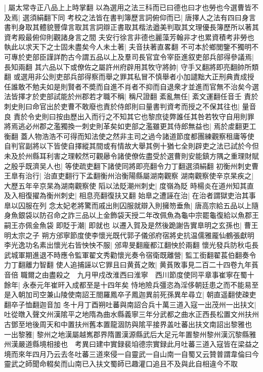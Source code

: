 |{
	屬太常寺正八品上上時掌翻}
以為選用之法三科而已曰德也曰才也勞也今選曹皆不及焉|{
	選須絹翻下同}
考校之法皆在書判簿歷言詞俯仰而已|{
	唐擇人之法有四曰身言書判身取其體貌豐偉言取其言詞辯正書取其楷法遒美判取其文理優長簿歷所以著其資考殿最俯仰則觀諸身言之間}
夫安行徐言非德也麗藻芳翰非才也累資積考非勞也執此以求天下之士固未盡矣今人未土著|{
	夫音扶著直畧翻}
不可本於鄉閭鑒不獨明不可專於吏部臣謹詳酌古今謂五品以上及羣司長官宜令宰臣進叙吏部兵部得參議焉|{
	長知兩翻}
其六品以下或僚佐之屬許州府辟用其牧守將帥|{
	守手又翻將即亮翻帥所類翻}
或選用非公則吏部兵部得察而舉之罪其私冒不慎舉者小加譴黜大正刑典責成授任誰敢不勉夫如是則賢者不奬而自進不肖者不抑而自退衆才並進而官無不治矣今選法皆擇才於吏部試能於州郡若才職不稱|{
	稱尺證翻}
紊亂無任|{
	紊文運翻任音壬}
責於刺史則曰命官出於吏曹不敢廢也責於侍郎則曰量書判資考而授之不保其往也|{
	量音良}
責於令史則曰按由歷出入而行之不知其它也黎庶徒弊誰任其咎若牧守自用則罪將焉逃必州郡之濫獨換一刺史則革矣如吏部之濫雖更其侍郎無益也|{
	焉於䖍翻更工衡翻}
蓋人物浩浩不可得而知法使之然非主司之過今諸道節度都團練觀察租庸等使自判官副將以下皆使自擇縱其間或有情故大舉其例十猶七全則辟吏之法已試於今但未及於州縣耳利害之理較然可觀曏令諸使僚佐盡受於選曹則安能鎮方隅之重理財賦之殷乎既濟吴人也|{
	等使疏吏翻下諸使同將即亮翻令力丁翻選須絹翻}
初衡州刺史曹王臯有治行|{
	治直吏翻行下孟翻衡州治衡陽縣屬湖南觀察}
湖南觀察使辛京杲疾之|{
	大歷五年辛京杲為湖南觀察使}
䧟以法貶潮州刺史|{
	度嶺為貶}
時楊炎在道州知其直及入相復擢為衡州刺史|{
	相息亮翻復扶又翻}
始臯之遭誣在治|{
	在治者謂獄吏治其事臯以囚服在列}
念太妃老將驚而戚出則囚服就辯入則擁笏垂魚|{
	唐高宗給五品以上隨身魚銀袋以防召命之詐三品以上金飾袋天授二年改佩魚為龜中宗罷龜復給以魚郡王嗣王亦佩金魚袋}
即貶于潮|{
	即就也}
以遷入賀及是然後跪謝告實臯明之玄孫也|{
	曹王明太宗之子}
朔方邠寧節度使李懷光既代郭子儀邠府宿將史抗温儒雅龎仙鶴張獻明李光逸功名素出懷光右皆怏怏不服|{
	邠卑旻翻龐都江翻怏於兩翻}
懷光發兵防秋屯長武城軍期進退不時應令監軍翟文秀勸懷光奏令宿衛既離營|{
	監工銜翻翟萇伯翻奏令力丁翻離力智翻}
使人追捕誣以它罪且曰黄萯之敗|{
	黄萯敗事見二百二十四卷九年萯音倍}
職爾之由盡殺之　九月甲戍改淮西曰淮寧　西川節度使同平章事崔寧在蜀十餘年|{
	永泰元年崔旰入成都至是十四年矣}
恃地險兵彊恣為淫侈朝廷患之而不能易至是入朝加司空兼山陵使南詔王閤羅鳳卒子鳳迦異前死孫異牟尋立|{
	朝直遥翻使疎吏翻卒子恤翻迦音加}
冬十月丁酉朔吐蕃與南詔合兵十萬三道入寇一出茂州一出扶文|{
	吐從暾入聲文州漢隂平之地隋為曲水縣義寧三年分武都之曲水正西長松置文州扶州古鄧至地後周天和中置扶州舊本置龍涸防與隂平接界盖吐蕃出扶文南詔出黎雅也}
一出黎雅|{
	黎州之地漢屬越嶲郡界隋置漢源縣武后大足元年置黎州黎州漢沉黎縣雅州漢嚴道縣境相接也　考異曰建中實録裴垍德宗實録此月吐蕃三道入寇皆在梁益之境而來年四月乃云去冬吐蕃三道來侵一自靈武一自山南一自蜀又云贊普謂韋倫曰今靈武之師聞命輟矣而山南已入扶文蜀師已趣灌口追且不及與此自相違今不取}
